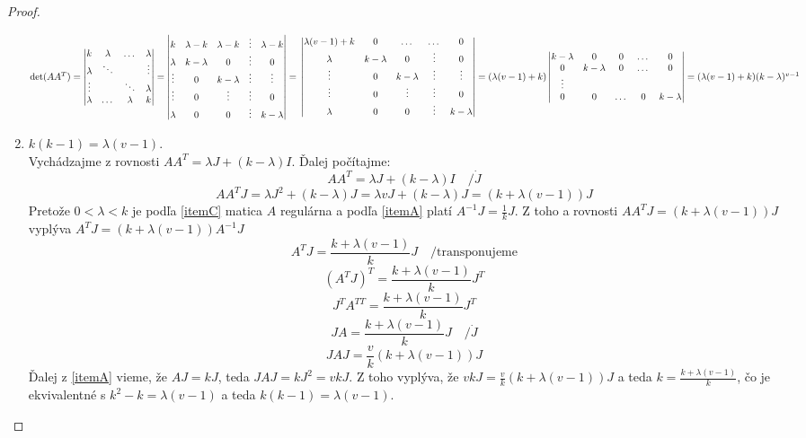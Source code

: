 \begin{proof}
\begin{enumerate}
	$ \det(A A^T) = \begin{vmatrix}
		k & \lambda & \dots & \lambda \\
		\lambda & \ddots & & \vdots \\
		\vdots &  & \ddots & \lambda \\
		\lambda & \dots & \lambda & k \\
	\end{vmatrix} = 
	\begin{vmatrix}
		k & \lambda -k & \lambda - k & \vdots & \lambda - k \\
		\lambda & k - \lambda & 0 & \vdots & 0 \\
		\vdots & 0 & k - \lambda & \vdots & \vdots \\
		\vdots & 0 & \vdots & \vdots & 0 \\
		\lambda & 0 & 0 & \vdots  & k - \lambda \\
	\end{vmatrix} = \\
	\begin{vmatrix}
		\lambda (v - 1) + k & 0 & \dots & \dots & 0 \\
		\lambda & k - \lambda & 0 & \vdots & 0 \\
		\vdots & 0 & k - \lambda & \vdots & \vdots \\
		\vdots & 0 & \vdots & \vdots & 0 \\
		\lambda & 0 & 0 & \vdots  & k - \lambda \\
	\end{vmatrix} = \\ (\lambda (v - 1) + k)
	\begin{vmatrix}
		k - \lambda & 0 & 0 & \dots & 0 \\
		0 & k - \lambda & 0 & \dots & 0 \\
		\vdots & & & & \\
		0 & 0 & \dots & 0 & k - \lambda \\
	\end{vmatrix} = (\lambda (v - 1) + k) (k - \lambda)^{v-1}
	$

	\item $k (k-1) = \lambda (v-1)$. \label{itemD} \\
	Vychádzajme z rovnosti $A A^T = \lambda J + (k - \lambda) I$. Ďalej počítajme:
	$$ A A^T = \lambda J + (k - \lambda) I \quad / \dot J$$
	$$ A A^T J = \lambda J^2 + (k - \lambda) J = \lambda v J + (k - \lambda) J = (k + \lambda(v - 1)) J $$
	Pretože $0 < \lambda < k$ je podľa \ref{itemC} matica $A$ regulárna a podľa \ref{itemA} platí $A^{-1} J = \frac{1}{k} J$. Z toho a rovnosti $A A^T J = (k + \lambda(v - 1)) J$ vyplýva $A^T J = (k + \lambda (v - 1)) A^{-1} J$
	$$ A^T J = \frac{k + \lambda (v - 1)}{k} J \quad / \text{transponujeme}$$
	$$ (A^T J)^T = \frac{k + \lambda (v - 1)}{k} J^T $$
	$$ J^T A^{TT} = \frac{k + \lambda (v - 1)}{k} J^T $$
	$$ JA = \frac{k + \lambda (v - 1)}{k} J \quad / \dot J $$
	$$ J A J = \frac{v}{k} (k + \lambda (v - 1)) J $$
	Ďalej z \ref{itemA} vieme, že $A J = k J$, teda $J A J = k J^2 = v k J$. Z toho vyplýva, že $v k J = \frac{v}{k} (k + \lambda (v - 1)) J$ a teda $k = \frac{k + \lambda (v - 1)}{k}$, čo je ekvivalentné s $k^2 - k = \lambda (v - 1)$ a teda $k (k - 1) = \lambda (v - 1)$.


\end{enumerate}
\end{proof}
